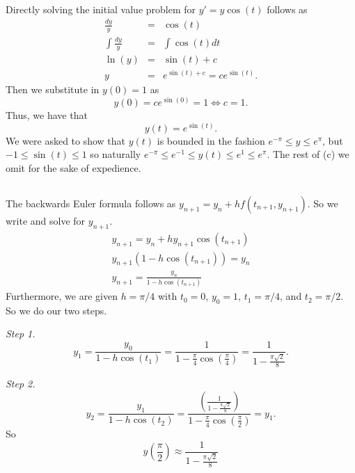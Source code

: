 \documentclass[12pt]{amsart}
\begin{document}
\begin{onehalfspace}
        \subsection{}
        Directly solving the initial value problem for $y'=y\cos(t)$ follows as
        \begin{eqnarray*}
            \frac{dy}{y} & = & \cos(t)\\
            \int \frac{dy}{y} & = & \int \cos(t) dt\\
            \ln(y) & = & \sin(t) + c\\
            y & = & e^{\sin(t) + c} = ce^{\sin(t)}.
        \end{eqnarray*}
        Then we substitute in $y(0)=1$ as
        \[
            y(0) = ce^{\sin(0)} = 1 \Leftrightarrow c = 1.
        \]
        Thus, we have that
        \[
            y(t) = e^{\sin(t)}.
        \]
        We were asked to show that $y(t)$ is bounded in the fashion $e^{-\pi}\le y \le e^\pi$, but $-1\le \sin(t)\le 1$
        so naturally $e^{-\pi}\le e^{-1}\le y(t) \le e^1\le e^\pi$.
        The rest of (c) we omit for the sake of expedience.

        \subsection{}
        The backwards Euler formula follows as $y_{n+1} = y_n + hf(t_{n+1}, y_{n+1})$.
        So we write and solve for $y_{n+1}$.
        \begin{gather*}
            y_{n+1} = y_n + h y_{n+1}\cos(t_{n+1})\\
            y_{n+1} (1-h\cos(t_{n+1})) = y_n\\
            y_{n+1} = \frac{y_n}{1-h\cos(t_{n+1})}
        \end{gather*}
        Furthermore, we are given $h=\pi/4$ with $t_0=0$, $y_0=1$, $t_1=\pi/4$, and $t_2=\pi/2$.
        So we do our two steps.

        \emph{Step 1.}
        \[
            y_1 = \frac{y_0}{1 - h\cos(t_1)} = \frac{1}{1-\frac{\pi}{4}\cos\left(\frac{\pi}{4}\right)}
             = \frac{1}{1-\frac{\pi\sqrt{2}}{8}}.
        \]

        \emph{Step 2.}
        \[
            y_2 = \frac{y_1}{1-h\cos(t_2)} = \frac{\left(\frac{1}{1-\frac{\pi\sqrt{2}}{8}}\right)}{1-\frac{\pi}{4}\cos\left(\frac{\pi}{2}\right)} = y_1.
        \]
        So
        \[
            y\left(\frac{\pi}{2}\right) \approx \frac{1}{1-\frac{\pi\sqrt{2}}{8}}
        \]


\end{onehalfspace}
\end{document}
